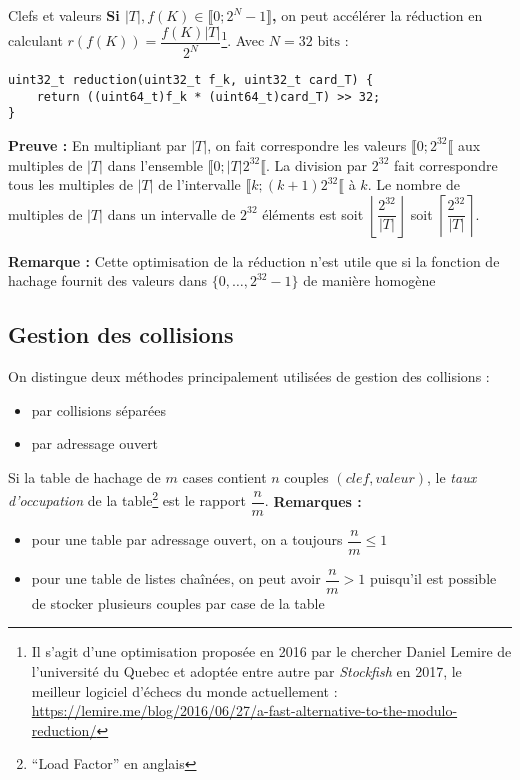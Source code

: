 \documentclass[../../../main.tex]{subfiles}
\begin{document}
\begin{definition}{Clefs et valeurs}
\textbf{Si $|T|, f(K)\in\llbracket 0; 2^N - 1\rrbracket$,} on peut accélérer la réduction en calculant $r(f(K)) = \dfrac{f(K)|T|}{2^N}$\footnote{Il s'agit d'une optimisation proposée en 2016 par le chercher Daniel Lemire de l'université du Quebec et adoptée entre autre par \textit{Stockfish} en 2017, le meilleur logiciel d'échecs du monde actuellement : \url{https://lemire.me/blog/2016/06/27/a-fast-alternative-to-the-modulo-reduction/}}. Avec $N = 32\text{ bits}$ :
\begin{verbatim}
uint32_t reduction(uint32_t f_k, uint32_t card_T) {
	return ((uint64_t)f_k * (uint64_t)card_T) >> 32;
}
\end{verbatim}
\textbf{Preuve :} En multipliant par $|T|$, on fait correspondre les valeurs $\llbracket 0; 2^{32}\llbracket$ aux multiples de $|T|$ dans l'ensemble $\llbracket 0; |T|2^{32}\llbracket$. La division par $2^{32}$ fait correspondre tous les multiples de $|T|$ de l'intervalle $\llbracket k; (k+1)2^{32}\llbracket$ à $k$. Le nombre de multiples de $|T|$ dans un intervalle de $2^{32}$ éléments est soit $\left\lfloor \dfrac{2^{32}}{|T|}\right\rfloor$ soit $\left\lceil \dfrac{2^{32}}{|T|}\right\rceil$.

\textbf{Remarque :} Cette optimisation de la réduction n'est utile que si la fonction de hachage fournit des valeurs dans $\{0, \dots, 2^{32}-1\}$ de manière homogène
\subsection{Gestion des collisions}
On distingue deux méthodes principalement utilisées de gestion des collisions :
\begin{itemize}
	\item par collisions séparées
	\item par adressage ouvert
\end{itemize}
 {
Si la table de hachage de $m$ cases contient $n$ couples $(clef, valeur)$, le \textit{taux d'occupation} de la table\footnote{``Load Factor'' en anglais} est le rapport $\dfrac{n}{m}$.
}
\textbf{Remarques :}
\begin{itemize}
	\item pour une table par adressage ouvert, on a toujours $\dfrac{n}{m}\leq 1$
	\item pour une table de listes chaînées, on peut avoir $\dfrac{n}{m} > 1$ puisqu'il est possible de stocker plusieurs couples par case de la table
\end{itemize}

\end{definition}
\end{document}
